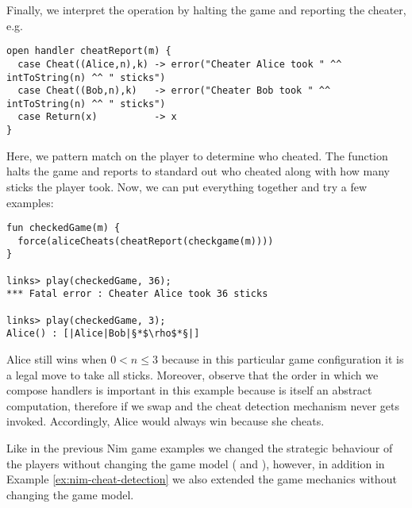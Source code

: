 \begin{example}
Finally, we interpret the  operation by halting the game and reporting the cheater, e.g.
\begin{lstlisting}[style=links]
open handler cheatReport(m) {
  case Cheat((Alice,n),k) -> error("Cheater Alice took " ^^ intToString(n) ^^ " sticks")
  case Cheat((Bob,n),k)   -> error("Cheater Bob took " ^^ intToString(n) ^^ " sticks")
  case Return(x)          -> x
}
\end{lstlisting}
Here, we pattern match on the player to determine who cheated. The  function halts the game and reports to standard out who cheated along with how many sticks the player took. Now, we can put everything together and try a few examples:
\begin{lstlisting}[style=links]
fun checkedGame(m) {
  force(aliceCheats(cheatReport(checkgame(m))))
}

links> play(checkedGame, 36);
*** Fatal error : Cheater Alice took 36 sticks

links> play(checkedGame, 3);
Alice() : [|Alice|Bob|§*$\rho$*§|]
\end{lstlisting}
Alice still wins when $0 < n \leq 3$ because in this particular game configuration it is a legal move to take all sticks.
Moreover, observe that the order in which we compose handlers is important in this example because  is itself an abstract computation, therefore if we swap  and  the cheat detection mechanism never gets invoked. Accordingly, Alice would always win because she cheats.
\end{example}
Like in the previous Nim game examples we changed the strategic behaviour of the players without changing the game model ( and ), however, in addition in Example \ref{ex:nim-cheat-detection} we also extended the game mechanics without changing the game model.

